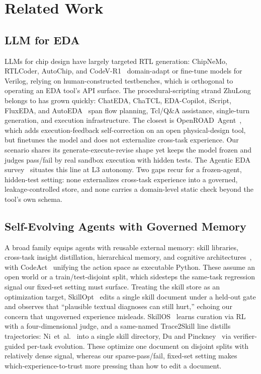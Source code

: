 \documentclass[conference]{IEEEtran}
\begin{document}
\section{Related Work}
\label{sec:related_work}

\subsection{LLM for EDA}
\label{sec:rw_eda}

LLMs for chip design have largely targeted RTL generation: ChipNeMo, RTLCoder, AutoChip, and CodeV-R1~\cite{liu2023chipnemo,liu2024rtlcoder,thakur2023autochip,zhu2026qimeng}
domain-adapt or fine-tune models for Verilog, relying on human-constructed
testbenches, which is orthogonal to operating an EDA tool's API surface.
The procedural-scripting strand ZhuLong belongs to has grown quickly:
ChatEDA, ChaTCL, EDA-Copilot, iScript, FluxEDA, and
AutoEDA~\cite{wu2024chateda,rui2025chatcl,xiao2025eda,xu2026iscript,chen2026fluxeda,lu2025autoeda}
span flow planning, Tcl/Q\&A assistance, single-turn generation, and execution
infrastructure. The closest is OpenROAD~Agent~\cite{wu2025openroad}, which
adds execution-feedback self-correction on an open physical-design tool, but
finetunes the model and does not externalize cross-task experience. Our scenario shares its
generate-execute-revise shape yet keeps the model frozen and judges pass/fail
by real sandbox execution with hidden tests. The Agentic EDA
survey~\cite{zang2025dawn} situates this line at L3 autonomy. Two gaps recur
for a frozen-agent, hidden-test setting: none externalizes cross-task
experience into a governed, leakage-controlled store, and none carries a
domain-level static check beyond the tool's own schema.

\subsection{Self-Evolving Agents with Governed Memory}
\label{sec:rw_self_evolving}

A broad family equips agents with reusable external memory: skill
libraries, cross-task insight distillation, hierarchical memory, and
cognitive architectures~\cite{wang2023voyager,zhao2024expel,packer2023memgpt,sumers2023cognitive},
with CodeAct~\cite{wang2024executable} unifying the action space as executable
Python. These assume an open world or a train/test-disjoint split, which
sidesteps the same-task regression signal our fixed-set setting must surface.
Treating the skill store as an optimization target, SkillOpt~\cite{yang2026skillopt}
edits a single skill document under a held-out gate and observes that
``plausible textual diagnoses can still hurt,'' echoing our concern that
ungoverned experience misleads. SkillOS~\cite{ouyang2026skillos} learns
curation via RL with a four-dimensional judge, and a same-named
Trace2Skill line distills trajectories: Ni~et~al.~\cite{ni2026trace2skill}
into a single skill directory, Du and Pinckney~\cite{du2026trace2skill} via
verifier-guided per-task evolution. These optimize one document on disjoint
splits with relatively dense signal, whereas our sparse-pass/fail, fixed-set
setting makes which-experience-to-trust more pressing than how to edit a
document.
\end{document}
